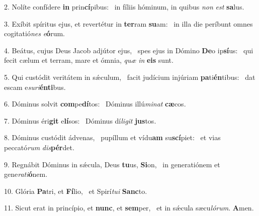 2. Nolíte confídere \textbf{in} prin\textbf{cí}pibus: \ast\  in fíliis hóminum, in quibus \textit{non} \textit{est} \textbf{sa}lus.\

3. Exíbit spíritus ejus, et revertétur in \textbf{ter}ram \textbf{su}am: \ast\  in illa die períbunt omnes cogitatió\textit{nes} \textit{e}\textbf{ó}rum.\

4. Beátus, cujus Deus Jacob adjútor ejus, \dag\  spes ejus in Dómino \textbf{De}o ip\textbf{sí}us: \ast\  qui fecit cælum et terram, mare et ómnia, \textit{quæ} \textit{in} \textbf{e}\textbf{is} sunt.\

5. Qui custódit veritátem in sǽculum, \dag\  facit judícium injúriam \textbf{pa}ti\textbf{én}tibus: \ast\  dat escam e\textit{su}\textit{ri}\textbf{én}\textbf{ti}bus.\

6. Dóminus solvit \textbf{com}pe\textbf{dí}tos: \ast\  Dóminus illú\textit{mi}\textit{nat} \textbf{cæ}cos.\

7. Dóminus éri\textbf{git} e\textbf{lí}sos: \ast\  Dóminus dí\textit{li}\textit{git} \textbf{jus}tos.\

8. Dóminus custódit ádvenas, \dag\  pupíllum et vídu\textbf{am} su\textbf{scí}piet: \ast\  et vias peccató\textit{rum} \textit{dis}\textbf{pér}det.\

9. Regnábit Dóminus in sǽcula, Deus \textbf{tu}us, \textbf{Si}on, \ast\  in generatiónem et gene\textit{ra}\textit{ti}\textbf{ó}nem.\

10. Glória \textbf{Pa}tri, et \textbf{Fí}lio, \ast\  et Spirí\textit{tu}\textit{i} \textbf{Sanc}to.\

11. Sicut erat in princípio, et \textbf{nunc}, et \textbf{sem}per, \ast\  et in sǽcula sæcu\textit{ló}\textit{rum}. \textbf{A}men.\


